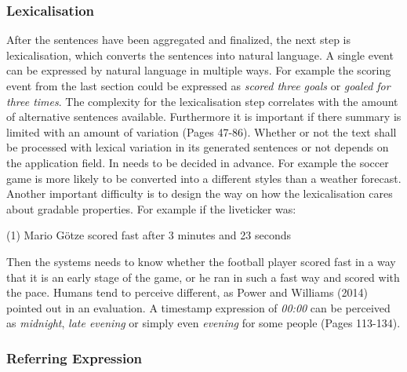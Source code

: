\subsubsection{Lexicalisation}\label{ss:lex}

After the sentences have been aggregated and finalized, the next step is lexicalisation, which converts the sentences into natural language. A single event can be expressed by natural language in multiple ways. For example the scoring event from the last section could be expressed as \textit{scored three goals} or \textit{goaled for three times}. The complexity for the lexicalisation step correlates with the amount of alternative sentences available. Furthermore it is important if there summary is limited with an amount of variation \cite{Theune} (Pages 47-86). Whether or not the text shall be processed with lexical variation in its generated sentences or not depends on the application field. In needs to be decided in advance. For example the soccer game is more likely to be converted into a different styles than a weather forecast. Another important difficulty is to design the way on how the lexicalisation cares about gradable properties. For example if the liveticker was:

\begin{tcolorbox}
	\begin{center}
		(1) Mario Götze scored fast after 3 minutes and 23 seconds
	\end{center}
\end{tcolorbox}

Then the systems needs to know whether the football player scored fast in a way that it is an early stage of the game, or he ran in such a fast way and scored with the pace. Humans tend to perceive different, as Power and Williams (2014) pointed out in an evaluation. A timestamp expression of \textit{00:00} can be perceived as \textit{midnight}, \textit{late evening} or simply even \textit{evening} for some people \cite{Power} (Pages 113-134).


\subsubsection{Referring Expression}\label{ss:ref}

